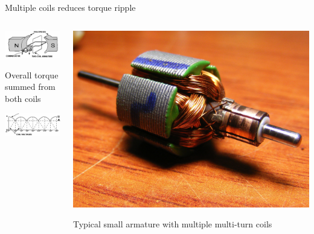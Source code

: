 \documentclass[compress]{beamer}
\begin{document}
\begin{frame}{Multiple coils reduces torque ripple}

    \begin{columns}
        \begin{column}{0.5\linewidth}
            \begin{center}
                \includegraphics[width=0.8\linewidth]{image26}

                \vspace{2em}

                \footnotesize Overall torque summed from both coils

                \includegraphics[width=0.8\linewidth]{image26-2}

            \end{center}
        \end{column}
        \begin{column}{0.5\linewidth}

            \begin{center}
                \includegraphics[width=0.8\linewidth]{image27}

                Typical small armature with multiple multi-turn coils
            \end{center}
        \end{column}
    \end{columns}


\end{frame}
\end{document}
